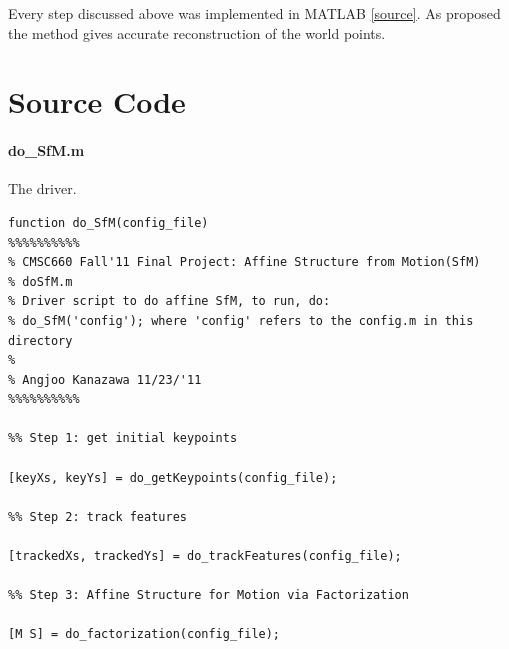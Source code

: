 Every step discussed above was implemented in MATLAB \ref{source}. As
proposed the method gives accurate reconstruction of the world
points. 

\appendix
\small
\section{Source Code}
\paragraph{do\_SfM.m}
The driver.
\begin{verbatim}
function do_SfM(config_file)
%%%%%%%%%%
% CMSC660 Fall'11 Final Project: Affine Structure from Motion(SfM)
% doSfM.m
% Driver script to do affine SfM, to run, do:
% do_SfM('config'); where 'config' refers to the config.m in this directory
%
% Angjoo Kanazawa 11/23/'11
%%%%%%%%%%

%% Step 1: get initial keypoints

[keyXs, keyYs] = do_getKeypoints(config_file); 

%% Step 2: track features

[trackedXs, trackedYs] = do_trackFeatures(config_file);

%% Step 3: Affine Structure for Motion via Factorization

[M S] = do_factorization(config_file);
\end{verbatim}
